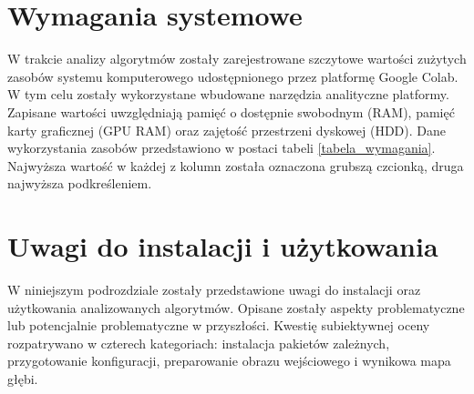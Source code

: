 \section{Wymagania systemowe}
W trakcie analizy algorytmów zostały zarejestrowane szczytowe wartości zużytych zasobów systemu komputerowego udostępnionego przez platformę Google Colab. W tym celu zostały wykorzystane wbudowane narzędzia analityczne platformy. Zapisane wartości uwzględniają pamięć o dostępnie swobodnym (RAM), pamięć karty graficznej (GPU RAM) oraz zajętość przestrzeni dyskowej (HDD). Dane wykorzystania zasobów przedstawiono w postaci tabeli \ref{tabela_wymagania}. Najwyższa wartość w każdej z kolumn została oznaczona grubszą czcionką, druga najwyższa podkreśleniem.

\begin{table}[H]
    \centering
    \caption{Wykorzystane przez algorytmy zasoby komputerowe.}
    \vspace{0.1cm}
    \label{tabela_wymagania}
\end{table}

\section{Uwagi do instalacji i użytkowania}
W niniejszym podrozdziale zostały przedstawione uwagi do instalacji oraz użytkowania analizowanych algorytmów. Opisane zostały aspekty problematyczne lub potencjalnie problematyczne w przyszłości. Kwestię subiektywnej oceny rozpatrywano w czterech kategoriach: instalacja pakietów zależnych, przygotowanie konfiguracji, preparowanie obrazu wejściowego i wynikowa mapa głębi.

